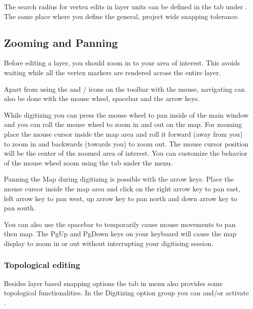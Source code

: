 The search radius for vertex edits in layer units can be defined in the
 tab under  \arrow
{}. The same place where you define the
general, project wide snapping tolerance.

\subsection{Zooming and Panning}

Before editing a layer, you should zoom in to your area of interest. This
avoids waiting while all the vertex markers are rendered across the entire
layer.

Apart from using the  and
/
icons on the toolbar with the mouse, navigating can also be done with the
mouse wheel, spacebar and the arrow keys.


While digitizing you can press the mouse wheel to pan inside of the main
window and you can roll the mouse wheel to zoom in and out on the map. For
zooming place the mouse cursor inside the map area and roll it forward (away
from you)
to zoom in and backwards (towards you) to zoom out. The mouse cursor position
will
be the center of the zoomed area of interest. You can customize the behavior
of the mouse wheel zoom using the  tab under the
 \arrow {} menu.


Panning the Map during digitizing is possible with the arrow keys. Place
the mouse cursor inside the map area and click on the right arrow key to
pan east, left arrow key to pan west, up arrow key to pan north and down
arrow key to pan south.

You can also use the spacebar to temporarily cause mouse movements to pan
then map. The PgUp and PgDown keys on your keyboard will cause the map
display to zoom in or out without interrupting your digitising session.

\subsubsection{Topological editing}

Besides layer based snapping options the  tab in menu
 \arrow {}
also provides some topological functionalities.
In the Digitizing option group you can  and/or activate
.

